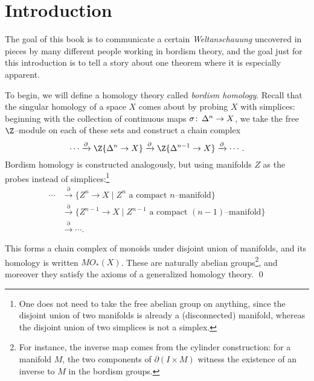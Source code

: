 
\setcounter{chapter}{-1}
\chapter{Introduction}

\label{IntroductionSection}

The goal of this book is to communicate a certain \textit{Weltanschauung} uncovered in pieces by many different people working in bordism theory, and the goal just for this introduction is to tell a story about one theorem where it is especially apparent.

To begin, we will define a homology theory called \textit{bordism homology}.  Recall that the singular homology of a space \(X\) comes about by probing \(X\) with simplices: beginning with the collection of continuous maps \(\sigma\colon\thinspace \Delta^n \to X\), we take the free \(\Z\)--module on each of these sets and construct a chain complex \[\cdots \xrightarrow{\partial} \Z\{\Delta^n \to X\} \xrightarrow{\partial} \Z\{\Delta^{n-1} \to X\} \xrightarrow{\partial} \cdots.\]  Bordism homology is constructed analogously, but using manifolds \(Z\) as the probes instead of simplices:\footnote{One does not need to take the free abelian group on anything, since the disjoint union of two manifolds is already a (disconnected) manifold, whereas the disjoint union of two simplices is not a simplex.}
\begin{align*}
\cdots & \xrightarrow{\partial} \{Z^n \to X \mid \text{\(Z^n\) a compact \(n\)--manifold}\} \\
& \xrightarrow{\partial} \{Z^{n-1} \to X \mid \text{\(Z^{n-1}\) a compact \((n-1)\)--manifold}\} \\
& \xrightarrow{\partial} \cdots.
\end{align*}

\begin{lemma}\label{OriginalDefnOfBordism}
This forms a chain complex of monoids under disjoint union of manifolds, and its homology is written \(MO_*(X)\).  These are naturally abelian groups\footnote{For instance, the inverse map comes from the cylinder construction: for a manifold \(M\), the two components of \(\partial(I \times M)\) witness the existence of an inverse to \(M\) in the bordism groups.}, and moreover they satisfy the axioms of a generalized homology theory. \qed
\end{lemma}

